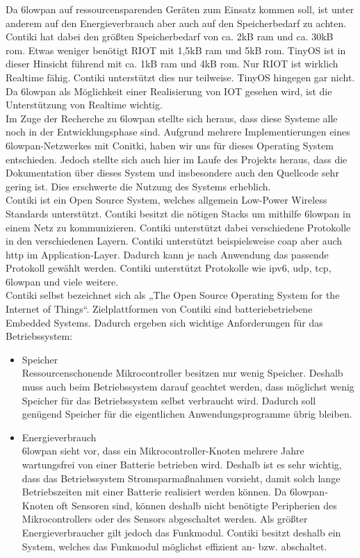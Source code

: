 	Da \ac{6lowpan} auf ressourcensparenden Geräten zum Einsatz kommen soll, ist unter anderem auf den Energieverbrauch aber auch auf den Speicherbedarf zu achten. Contiki hat dabei den größten Speicherbedarf von ca. 2kB \ac{ram} und ca. 30kB \ac{rom}. Etwas weniger benötigt RIOT mit 1,5kB \ac{ram} und 5kB \ac{rom}. TinyOS ist in dieser Hinsicht führend mit ca. 1kB \ac{ram} und 4kB \ac{rom}. Nur RIOT ist wirklich Realtime fähig. Contiki unterstützt dies nur teilweise. TinyOS hingegen gar nicht. Da \ac{6lowpan} als Möglichkeit einer Realisierung von IOT gesehen wird, ist die Unterstützung von Realtime wichtig.\\
	Im Zuge der Recherche zu \ac{6lowpan} stellte sich heraus, dass diese Systeme alle noch in der Entwicklungsphase sind. Aufgrund mehrere Implementierungen eines \ac{6lowpan}-Netzwerkes mit Conitki, haben wir uns für dieses Operating System entschieden. Jedoch stellte sich auch hier im Laufe des Projekts heraus, dass die Dokumentation über dieses System und insbesondere auch den Quellcode sehr gering ist. Dies erschwerte die Nutzung des Systems erheblich.\\
	
	Contiki ist ein Open Source System, welches allgemein Low-Power Wireless Standards unterstützt. Contiki besitzt die nötigen Stacks um mithilfe \ac{6lowpan} in einem Netz zu kommunizieren. Contiki unterstützt dabei verschiedene Protokolle in den verschiedenen Layern. Contiki unterstützt beispielsweise \ac{coap} aber auch \ac{http} im Application-Layer. Dadurch kann je nach Anwendung das passende Protokoll gewählt werden. Contiki unterstützt Protokolle wie \ac{ipv6}, \ac{udp}, \ac{tcp}, \ac{6lowpan} und viele weitere.\\
	Contiki selbst bezeichnet sich als „The Open Source Operating System for the Internet of Things“. Zielplattformen von Contiki sind batteriebetriebene Embedded Systems. Dadurch ergeben sich wichtige Anforderungen für das Betriebssystem:
	\begin{itemize}
		\item Speicher\\
		Ressourcenschonende Mikrocontroller besitzen nur wenig Speicher. Deshalb muss auch beim Betriebssystem darauf geachtet werden, dass möglichst wenig Speicher für das Betriebssystem selbst verbraucht wird. Dadurch soll genügend Speicher für die eigentlichen Anwendungsprogramme übrig bleiben.       
		\item Energieverbrauch\\
		\ac{6lowpan} sieht vor, dass ein Mikrocontroller-Knoten mehrere Jahre wartungsfrei von einer Batterie betrieben wird. Deshalb ist es sehr wichtig, dass das Betriebssystem Stromsparmaßnahmen vorsieht, damit solch lange Betriebszeiten mit einer Batterie realisiert werden können. Da \ac{6lowpan}-Knoten oft Sensoren sind, können deshalb nicht benötigte Peripherien des Mikrocontrollers oder des Sensors abgeschaltet werden. Als größter Energieverbraucher gilt jedoch das Funkmodul. Contiki besitzt deshalb ein System, welches das Funkmodul möglichst effizient an- bzw. abschaltet.
	\end{itemize}
	
